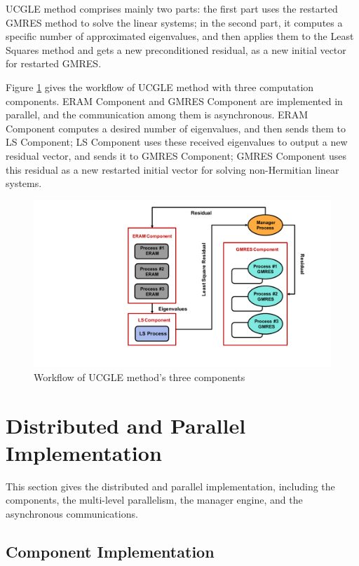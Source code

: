 UCGLE method comprises mainly two parts: the first part uses the restarted GMRES method to solve the linear systems; in the second part, it computes a specific number of approximated eigenvalues, and then applies them to the Least Squares method and gets a new preconditioned residual, as a new initial vector for restarted GMRES. 

Figure \ref{fig:worflow} gives the workflow of UCGLE method with three computation components. ERAM Component and GMRES Component are implemented in parallel, and the communication among them is asynchronous. ERAM Component computes a desired number of eigenvalues, and then sends them to LS Component; LS Component uses these received eigenvalues to output a new residual vector, and sends it to GMRES Component; GMRES Component uses this residual as a new restarted initial vector for solving non-Hermitian linear systems.

\begin{figure}[htbp]
	\centering
	\includegraphics[width=5.2in]{fig/workflow.pdf}
	\caption{Workflow of UCGLE method's three components}
	\label{fig:worflow}
\end{figure}


\section{Distributed and Parallel Implementation}\label{Distributed and Parallel Implementation}

This section gives the distributed and parallel implementation, including the components, the multi-level parallelism, the manager engine, and the asynchronous communications.
\subsection{Component Implementation}

